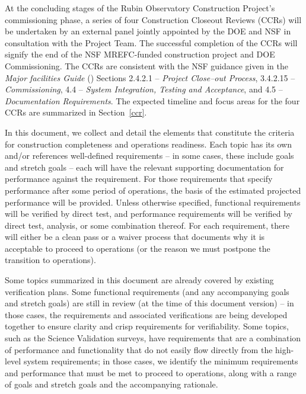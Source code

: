 At the concluding stages of the Rubin Observatory Construction Project's commissioning phase, a series of four Construction Closeout Reviews (CCRs) will be undertaken by an external panel jointly appointed by the DOE and NSF in consultation with the Project Team.
The successful completion of the CCRs will signify the end of the NSF MREFC-funded construction project and DOE Commissioning.
The CCRs are consistent with the NSF guidance given in the {\it Major facilities Guide} () Sections 2.4.2.1 -- {\it Project Close--out Process}, 3.4.2.15 -- {\it Commissioning}, 4.4 -- {\it System Integration, Testing and Acceptance}, and 4.5 -- {\it Documentation Requirements}.
The expected timeline and focus areas for the four CCRs are summarized in Section~\ref{ccr}.



In this document, we collect and detail the elements that constitute the criteria for construction completeness and operations readiness.
Each topic has its own and/or references well-defined requirements -- in some cases, these include goals and stretch goals -- each will have the relevant supporting documentation for performance against the requirement.
For those requirements that specify performance after some period of operations, the basis of the estimated projected performance will be provided.
Unless otherwise specified, functional requirements will be verified by direct test, and performance requirements will be verified by direct test, analysis, or some combination thereof.
For each requirement, there will either be a clean pass or a waiver process that documents why it is acceptable to proceed to operations (or the reason we must postpone the transition to operations).

Some topics summarized in this document are already covered by existing verification plans.
Some functional requirements (and any accompanying goals and stretch goals) are still in review (at the time of this document version) -- in those cases, the requirements and associated verifications are being developed together to ensure clarity and crisp requirements for verifiability.
Some topics, such as the Science Validation surveys, have requirements that are a combination of performance and functionality that do not easily flow directly from the high-level system requirements; in those cases, we identify the minimum requirements and performance that must be met to proceed to operations, along with a range of goals and stretch goals and the accompanying rationale.

